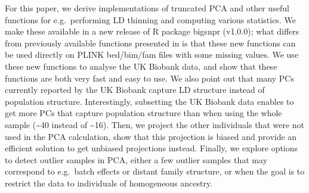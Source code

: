 \documentclass{bioinfo}
\begin{document}
For this paper, we derive implementations of truncated PCA and other useful functions for e.g.\ performing LD thinning and computing various statistics. We make these available in a new release of R package bigsnpr (v1.0.0); what differs from previously available functions presented in \cite{prive2017efficient} is that these new functions can be used directly on PLINK bed/bim/fam files with some missing values. 
We use these new functions to analyse the UK Biobank data, and show that these functions are both very fast and easy to use. We also point out that many PCs currently reported by the UK Biobank capture LD structure instead of population structure. 
Interestingly, subsetting the UK Biobank data enables to get more PCs that capture population structure than when using the whole sample (\textasciitilde40 instead of \textasciitilde16).
Then, we project the other individuals that were not used in the PCA calculation, show that this projection is biased and provide an efficient solution to get unbiased projections instead.
Finally, we explore options to detect outlier samples in PCA, either a few outlier samples that may correspond to e.g.\ batch effects or distant family structure, or when the goal is to restrict the data to individuals of homogeneous ancestry.

\end{document}
